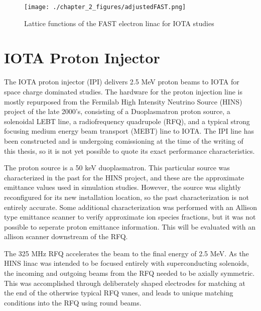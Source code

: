 \begin{figure}
	\centering
	\texttt{[image: ./chapter\_2\_figures/adjustedFAST.png]}
	\caption{Lattice functions of the FAST electron linac for IOTA studies}
	\label{fig:linacLat}
\end{figure}

\section{IOTA Proton Injector}

The IOTA proton injector (IPI) delivers 2.5 MeV proton beams to IOTA for space charge dominated studies. The hardware for the proton injection line is mostly repurposed from the Fermilab High Intensity Neutrino Source (HINS) \cite{webberHINS} project of the late 2000's, consisting of a Duoplasmatron proton source, a solenoidal LEBT line, a radiofrequency quadrupole (RFQ), and a typical strong focusing medium energy beam transport (MEBT) line \cite{edstromIPI} to IOTA. The IPI line has been constructed and is undergoing comissioning at the time of the writing of this thesis, so it is not yet possible to quote its exact performance characteristics.

The proton source is a 50 keV duoplasmatron. This particular source was characterized in the past \cite{tamThesis} for the HINS project, and these are the approximate emittance values used in simulation studies. However, the source was slightly reconfigured for its new installation location, so the past characterization is not entirely accurate. Some additional characterization was performed with an Allison type emittance scanner to verify approximate ion species fractions, but it was not possible to seperate proton emittance information. This will be evaluated with an allison scanner downstream of the RFQ.

The 325 MHz RFQ accelerates the beam to the final energy of 2.5 MeV. As the HINS linac was intended to be focused entirely with superconducting solenoids, the incoming and outgoing beams from the RFQ needed to be axially symmetric. This was accomplished through deliberately shaped electrodes for matching at the end of the otherwise typical RFQ vanes, and leads to unique matching conditions into the RFQ using round beams. 

